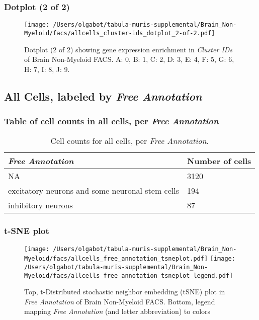 \clearpage

\subsubsection{Dotplot (2 of 2)}
\begin{figure}[h]
\centering
\texttt{[image: /Users/olgabot/tabula-muris-supplemental/Brain\_Non-Myeloid/facs/allcells\_cluster-ids\_dotplot\_2-of-2.pdf]}

\caption{ Dotplot (2 of 2)  showing gene expression enrichment in \emph{Cluster IDs} of Brain Non-Myeloid FACS. A: 0, B: 1, C: 2, D: 3, E: 4, F: 5, G: 6, H: 7, I: 8, J: 9.}
\end{figure}


\clearpage

\subsection{All Cells, labeled by \emph{Free Annotation}}
\subsubsection{Table of cell counts in all cells, per \emph{Free Annotation}}\begin{table}[h]
\centering
\label{my-label}
\begin{tabular}{@{}ll@{}}
\toprule

\emph{Free Annotation}& Number of cells \\ \midrule
NA & 3120 \\

excitatory neurons and some neuronal stem cells & 194 \\

inhibitory neurons & 87 \\
\bottomrule
\end{tabular}
\caption{Cell counts for all cells, per \emph{Free Annotation}.}
\end{table}

\clearpage
\subsubsection{t-SNE plot}
\begin{figure}[h]
\centering
\texttt{[image: /Users/olgabot/tabula-muris-supplemental/Brain\_Non-Myeloid/facs/allcells\_free\_annotation\_tsneplot.pdf]}
\texttt{[image: /Users/olgabot/tabula-muris-supplemental/Brain\_Non-Myeloid/facs/allcells\_free\_annotation\_tsneplot\_legend.pdf]}
\caption{Top, t-Distributed stochastic neighbor embedding (tSNE) plot  in \emph{Free Annotation} of Brain Non-Myeloid FACS. Bottom, legend mapping \emph{Free Annotation} (and letter abbreviation) to colors}
\end{figure}


